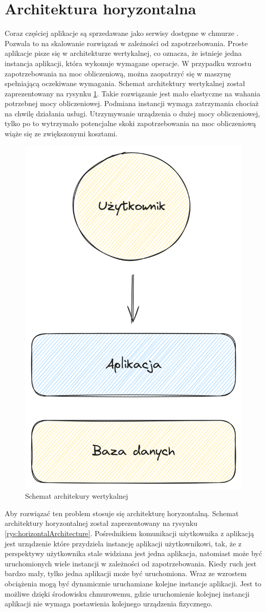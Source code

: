 \section{Architektura horyzontalna}

Coraz częściej aplikacje są sprzedawane jako serwisy dostępne w chmurze \cite{horizontalArchitecture}.
Pozwala to na skalowanie rozwiązań w zależności od zapotrzebowania.
Proste aplikacje pisze się w architekturze wertykalnej, co oznacza, że istnieje jedna instancja aplikacji, która wykonuje wymagane operacje.
W przypadku wzrostu zapotrzebowania na moc obliczeniową, można zaopatrzyć się w maszynę spełniającą oczekiwane wymagania.
Schemat architektury wertykalnej został zaprezentowany na rysynku \ref{rys:veriticalArchitecture}.
Takie rozwiązanie jest mało elastyczne na wahania potrzebnej mocy obliczeniowej.
Podmiana instancji wymaga zatrzymania chociaż na chwilę działania usługi.
Utrzymywanie urządzenia o dużej mocy obliczeniowej, tylko po to wytrzymało potencjalne skoki zapotrzebowania na moc obliczeniową wiąże się ze zwiększonymi kosztami.

\begin{figure}[!hb]
	\centering \includegraphics[width=0.5\linewidth]{rysunki/vertical_archtecture.png}
	\caption{Schemat architekury wertykalnej}
	\label{rys:veriticalArchitecture}
\end{figure}


Aby rozwiązać ten problem stosuje się architekturę horyzontalną.
Schemat architektury horyzontalnej został zaprezentowany na rysynku \ref{rys:horizontalArchitecture}.
Pośrednikiem komunikacji użytkownika z aplikacją jest urządzenie które przydziela instancję aplikacji użytkownikowi, tak, że z perspektywy użytkownika stale widziana jest jedna aplikacja, natomiast może być uruchomionych wiele instancji w zależności od zapotrzebowania.
Kiedy ruch jest bardzo mały, tylko jedna aplikacji może być uruchomiona.
Wraz ze wzrostem obciążenia mogą być dynamicznie uruchamiane kolejne instancje aplikacji.
Jest to możliwe dzięki środowisku chmurowemu, gdzie uruchomienie kolejnej instancji aplikacji nie wymaga postawienia kolejnego urządzenia fizycznego.

